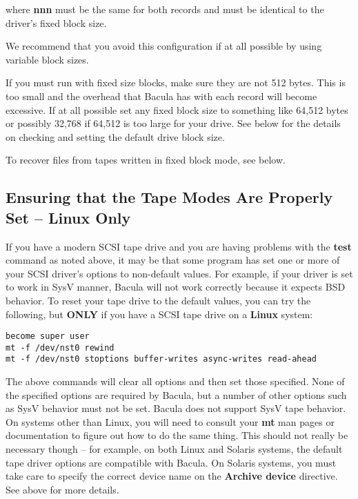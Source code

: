 where {\bf nnn} must be the same for both records and must be identical to the
driver's fixed block size.

We recommend that you avoid this configuration if at all possible by using
variable block sizes.

If you must run with fixed size blocks, make sure they are not 512 bytes. This
is too small and the overhead that Bacula has with each record will become
excessive. If at all possible set any fixed block size to something like
64,512 bytes or possibly 32,768 if 64,512 is too large for your drive. See
below for the details on checking and setting the default drive block size.

To recover files from tapes written in fixed block mode, see below.

\label{TapeModes}
\subsection{Ensuring that the Tape Modes Are Properly Set -- {\bf Linux
Only}}

If you have a modern SCSI tape drive and you are having problems with the {\bf
test} command as noted above, it may be that some program has set one or more
of your SCSI driver's options to non-default values. For example, if your
driver is set to work in SysV manner, Bacula will not work correctly because
it expects BSD behavior. To reset your tape drive to the default values, you
can try the following, but {\bf ONLY} if you have a SCSI tape drive on a {\bf
Linux} system:

\footnotesize
\begin{verbatim}
become super user
mt -f /dev/nst0 rewind
mt -f /dev/nst0 stoptions buffer-writes async-writes read-ahead
\end{verbatim}
\normalsize

The above commands will clear all options and then set those specified. None
of the specified options are required by Bacula, but a number of other options
such as SysV behavior must not be set. Bacula does not support SysV tape
behavior. On systems other than Linux, you will need to consult your {\bf mt}
man pages or documentation to figure out how to do the same thing. This should
not really be necessary though -- for example, on both Linux and Solaris
systems, the default tape driver options are compatible with Bacula.
On Solaris systems, you must take care to specify the correct device
name on the {\bf Archive device} directive. See above for more details.

